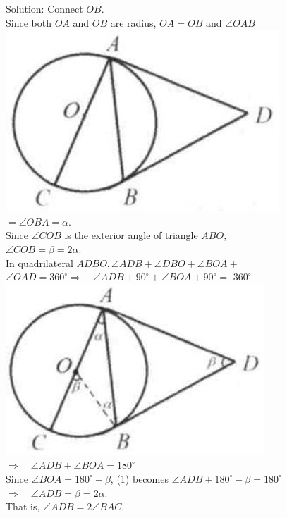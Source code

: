 \documentclass[10pt]{article}
\begin{document}
Solution:
Connect \(O B\).\\
Since both \(O A\) and \(O B\) are radius, \(O A=O B\) and \(\angle O A B\)\\
\includegraphics[max width=\textwidth, center]{2025_04_17_97bc1f7e44d93c271a88g-147}\\
\(=\angle O B A=\alpha\).\\
Since \(\angle C O B\) is the exterior angle of triangle \(A B O\),\\
\(\angle C O B=\beta=2 \alpha\).\\
In quadrilateral \(A D B O, \angle A D B+\angle D B O+\angle B O A+\) \(\angle O A D=360^{\circ} \Rightarrow \quad \angle A D B+90^{\circ}+\angle B O A+90^{\circ}=\) \(360^{\circ}\)\\
\includegraphics[max width=\textwidth, center]{2025_04_17_97bc1f7e44d93c271a88g-147(3)}\\
\(\Rightarrow \quad \angle A D B+\angle B O A=180^{\circ}\)\\
Since \(\angle B O A=180^{\circ}-\beta\), (1) becomes \(\angle A D B+180^{\circ}-\beta=180^{\circ}\)\\
\(\Rightarrow \quad \angle A D B=\beta=2 \alpha\).\\
That is, \(\angle A D B=2 \angle B A C\).
\end{document}
